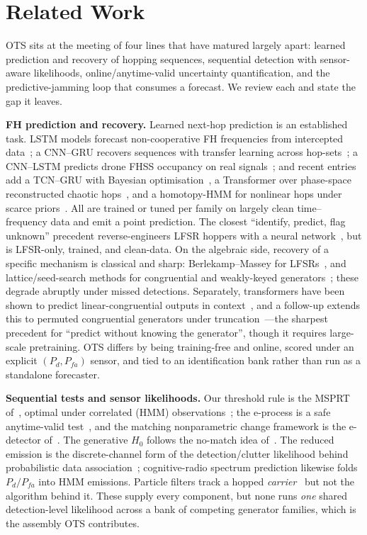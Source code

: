 \documentclass[conference]{IEEEtran}
\begin{document}
\section{Related Work}
OTS sits at the meeting of four lines that have matured largely apart:
learned prediction and recovery of hopping sequences, sequential detection
with sensor-aware likelihoods, online/anytime-valid uncertainty
quantification, and the predictive-jamming loop that consumes a forecast.
We review each and state the gap it leaves.

\textbf{FH prediction and recovery.} Learned next-hop prediction is an
established task. LSTM models forecast non-cooperative FH frequencies from
intercepted data~\cite{li2020lstm,li2021china}; a CNN--GRU recovers sequences
with transfer learning across hop-sets~\cite{zhu2023recovery}; a CNN--LSTM
predicts drone FHSS occupancy on real
signals~\cite{basak2024spectrum}; and recent entries add a TCN--GRU with
Bayesian optimisation~\cite{zhong2024tcngru}, a Transformer over phase-space
reconstructed chaotic hops~\cite{cao2025transformer}, and a homotopy-HMM for
nonlinear hops under scarce priors~\cite{deng2025hthmm}. All are trained or
tuned per family on largely clean time--frequency data and emit a point
prediction. The closest ``identify, predict, flag unknown'' precedent
reverse-engineers LFSR hoppers with a neural
network~\cite{strickland2023}, but is LFSR-only, trained, and clean-data. On
the algebraic side, recovery of a specific mechanism is classical and sharp:
Berlekamp--Massey for LFSRs~\cite{massey1969}, and lattice/seed-search methods
for congruential and weakly-keyed generators~\cite{reeds1977}; these degrade
abruptly under missed detections. Separately, transformers have been shown to
predict linear-congruential outputs in context~\cite{tao2025transformers}, and
a follow-up extends this to permuted congruential generators under
truncation~\cite{tao2026pcg}---the sharpest precedent for ``predict without
knowing the generator'', though it requires large-scale pretraining. OTS
differs by being training-free and online, scored under an explicit
$(P_d,P_{fa})$ sensor, and tied to an identification bank rather than run as a
standalone forecaster.

\textbf{Sequential tests and sensor likelihoods.} Our threshold rule is the
MSPRT of~\cite{baum1994}, optimal under correlated (HMM)
observations~\cite{dragalin1999}; the e-process is a safe anytime-valid
test~\cite{ramdas2023}, and the matching nonparametric change framework is the
e-detector of~\cite{shin2023edetectors}. The generative $H_0$ follows the
no-match idea of~\cite{gutman1989}. The reduced emission is the
discrete-channel form of the detection/clutter likelihood behind probabilistic
data association~\cite{barshalom2009}; cognitive-radio spectrum prediction
likewise folds $P_d/P_{fa}$ into HMM emissions. Particle filters track a hopped
\emph{carrier}~\cite{valyrakis2009,sidiropoulos2006} but not the algorithm
behind it. These supply every component, but none runs \emph{one} shared
detection-level likelihood across a bank of competing generator families, which
is the assembly OTS contributes.
\end{document}

